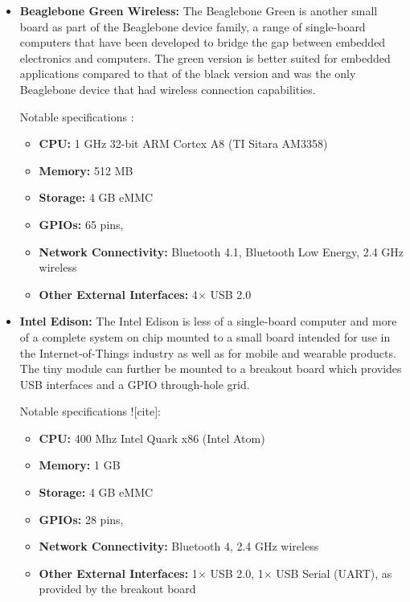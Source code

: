 \begin{itemize}
        \item \textbf{Beaglebone Green Wireless:}
          The Beaglebone Green is another small board as part of the Beaglebone device family, a range of single-board computers that have been developed to bridge the gap between embedded electronics and computers. The green version is better suited for embedded applications compared to that of the black version and was the only Beaglebone device that had wireless connection capabilities.
          
          Notable specifications \cite{mouserbeaglebone_2016}:
          \begin{itemize}
            \item \textbf{CPU:} 1 GHz 32-bit ARM Cortex A8 (TI Sitara AM3358)
            \item \textbf{Memory:} 512 MB
            \item \textbf{Storage:} 4 GB eMMC
            \item \textbf{GPIOs:} 65 pins, 
            \item \textbf{Network Connectivity:} Bluetooth 4.1, Bluetooth Low Energy, 2.4 GHz wireless
            \item \textbf{Other External Interfaces:} 4$\times$ USB 2.0
          \end{itemize}
          
        \item \textbf{Intel Edison:}
          The Intel Edison is less of a single-board computer and more of a complete system on chip mounted to a small board intended for use in the Internet-of-Things industry as well as for mobile and wearable products. The tiny module can further be mounted to a breakout board which provides USB interfaces and a GPIO through-hole grid.

          Notable specifications ![cite]:
          \begin{itemize}
            \item \textbf{CPU:} 400 Mhz Intel Quark x86 (Intel Atom)
            \item \textbf{Memory:} 1 GB
            \item \textbf{Storage:} 4 GB eMMC
            \item \textbf{GPIOs:} 28 pins, 
            \item \textbf{Network Connectivity:} Bluetooth 4, 2.4 GHz wireless
            \item \textbf{Other External Interfaces:} 1$\times$ USB 2.0, 1$\times$ USB Serial (UART), as provided by the breakout board
          \end{itemize}
 

\end{itemize}
